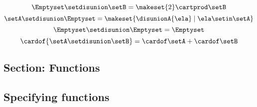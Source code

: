 \begin{forslides}
\begin{equation}
        \Emptyset \setdisunion \setB =  \makeset{2} \cartprod \setB
    \end{equation}
    \begin{equation}
        \label{eq:slides_session2_73}
        \setA \setdisunion \Emptyset =  \makeset{ \disunionA{\ela} \mid \ela \setin\setA }
    \end{equation}
    \begin{equation}
        \label{eq:slides_session2_74}
        \Emptyset \setdisunion \Emptyset = \Emptyset
    \end{equation}
    \begin{equation}
        \label{eq:slides_session2_75}
        \cardof{ \setA \setdisunion \setB}  = \cardof \setA  + \cardof \setB
    \end{equation}

    \subsection{Section: Functions}

    \subsection{Specifying functions}


\end{forslides}
